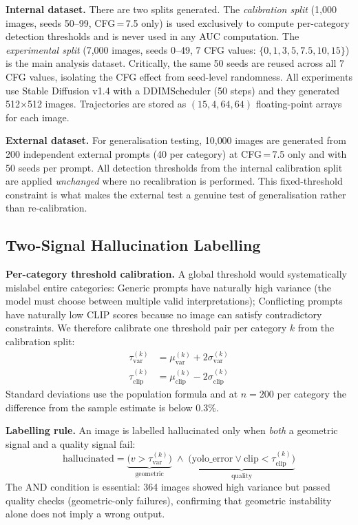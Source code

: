 \documentclass[conference]{IEEEtran}
\begin{document}
\textbf{Internal dataset.} There are two splits generated. The
\emph{calibration split} (1{,}000 images, seeds 50--99,
CFG\,=\,7.5 only) is used exclusively to compute per-category
detection thresholds and is never used in any AUC computation.
The \emph{experimental split} (7{,}000 images, seeds 0--49,
7 CFG values: $\{0, 1, 3, 5, 7.5, 10, 15\}$) is the main analysis
dataset. Critically, the same 50 seeds are reused across all 7 CFG
values, isolating the CFG effect from seed-level randomness.
All experiments use Stable Diffusion v1.4 with a DDIMScheduler
(50 steps) and they generated 512$\times$512 images. Trajectories are
stored as $(15, 4, 64, 64)$ floating-point arrays for each image.

\textbf{External dataset.} For generalisation testing, 10{,}000
images are generated from 200 independent external prompts (40 per
category) at CFG\,=\,7.5 only and with 50 seeds per prompt. All
detection thresholds from the internal calibration split are applied
\emph{unchanged} where no recalibration is performed. This fixed-threshold
constraint is what makes the external test a genuine test of
generalisation rather than re-calibration.

\subsection{Two-Signal Hallucination Labelling}
\label{sec:labelling}

\textbf{Per-category threshold calibration.} A global threshold would
systematically mislabel entire categories: Generic prompts have
naturally high variance (the model must choose between multiple valid
interpretations); Conflicting prompts have naturally low CLIP scores
because no image can satisfy contradictory constraints. We therefore
calibrate one threshold pair per category $k$ from the calibration
split:
\begin{align}
  \tau_\text{var}^{(k)} &= \mu_\text{var}^{(k)} + 2\sigma_\text{var}^{(k)}
  \label{eq:tvar} \\
  \tau_\text{clip}^{(k)} &= \mu_\text{clip}^{(k)} - 2\sigma_\text{clip}^{(k)}
  \label{eq:tclip}
\end{align}
Standard deviations use the population formula and at $n{=}200$ per
category the difference from the sample estimate is below 0.3\%.

\textbf{Labelling rule.} An image is labelled hallucinated only when
\emph{both} a geometric signal and a quality signal fail:
\begin{equation}
  \text{hallucinated} =
    \underbrace{\bigl(v > \tau_\text{var}^{(k)}\bigr)}_{\text{geometric}}
    \;\wedge\;
    \underbrace{\bigl(\text{yolo\_error} \vee \text{clip} < \tau_\text{clip}^{(k)}\bigr)}_{\text{quality}}
  \label{eq:label}
\end{equation}
The AND condition is essential: 364 images showed high variance but
passed quality checks (geometric-only failures), confirming that
geometric instability alone does not imply a wrong output.
\end{document}

